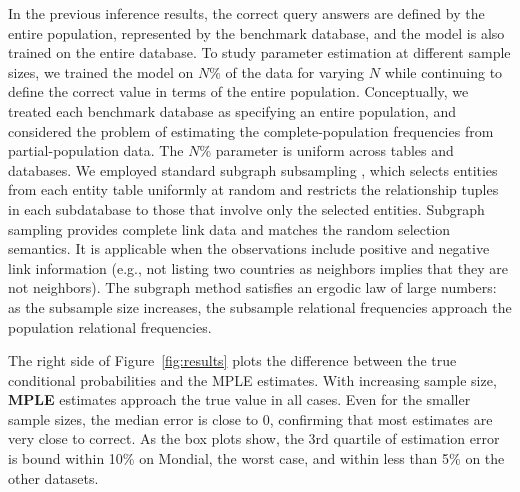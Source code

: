 \documentclass[oribibl]{llncs}
\begin{document}
In the previous inference results, the correct query answers are defined by the entire population, represented by the benchmark database, and the model is also trained on the entire database.
To study parameter estimation at different sample sizes, we trained the model on $N\%$ of the data for varying $N$ while continuing to define the correct value in terms of the entire population. 
Conceptually, we treated each benchmark database as specifying an entire population, and considered the problem of estimating the complete-population frequencies from partial-population data. The $N\%$ parameter is uniform across tables and databases. 
We employed standard subgraph subsampling \cite{Frank1977,Khosravi2010}, which selects entities from each entity table uniformly at random and restricts the relationship tuples in each subdatabase to those that involve only the selected entities. Subgraph sampling provides complete link data and matches the random selection semantics. It is applicable when the observations include positive and negative link information (e.g., not listing two countries as neighbors implies that they are not neighbors). The subgraph method satisfies an ergodic law of large numbers: as the subsample size increases, the subsample relational frequencies approach the population relational frequencies. 


The right side of Figure~\ref{fig:results} plots the difference between the true conditional probabilities and the MPLE estimates.
With increasing sample size, \textbf{MPLE} estimates approach the true value in all cases. Even for the smaller sample sizes, the median error is close to 0, confirming that most estimates are very close to correct. As the box plots show, the 3rd quartile of estimation error is bound within 10\% on Mondial, the worst case, and within less than 5\% on the other datasets. %
\end{document}
